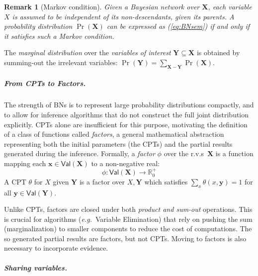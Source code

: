\documentclass[10pt,a4paper]{article}
\newcommand*{\eg}{\emph{e.g.}\xspace}
\newcommand*{\difset}{\mathrel{-}}
\newcommand{\Real}{\mathbb{R}}
\newcommand{\nnReal}{\Real^+_0}
\newcommand*{\setofrv}[1]{\mathsf{Val}(#1)}
\newcommand{\bX}{\mathbf X}
\newcommand{\bY}{\mathbf Y}
\newcommand{\bx}{{\mathbf x}}
\newcommand{\by}{{\mathbf y}}
\newcommand*{\someqfact}{\phi}
\newcommand{\rvs}{r.v.s\xspace}
\newtheorem{remark}[theorem]{Remark}
\begin{document}
\begin{remark}[Markov condition]
Given a Bayesian network over $\bX$, each variable $X$ is assumed to be independent of its non-descendants, given its parents.
A probability distribution $\Pr(\bX)$ can be expressed as (\ref{eq:BNsem}) if and only if it satisfies such a Markov condition.
\end{remark}

The \emph{marginal distribution} over the \emph{variables of interest} $\bY \subseteq \bX$ is obtained by summing-out the irrelevant variables:
$\Pr(\bY)= \sum_{\bX\difset\bY} \Pr(\bX)$.
 
\subparagraph{From CPTs to Factors.}

The strength of BNs is to represent large probability distributions compactly, and to allow for inference algorithms that do not construct the full joint distribution explicitly.
CPTs alone are insufficient for this purpose, motivating the definition of a class of functions called \emph{factors}, a general mathematical abstraction representing both the initial parameters (the CPTs) and the partial results generated during the inference.
Formally, a \emph{factor} $\someqfact$ over the \rvs\ $\bX$ is a function mapping each $\bx\in\setofrv{\bX}$ to a non-negative real:
\begin{equation}
\label{eq:factor}
\someqfact:\setofrv{\bX}\to\nnReal
\end{equation}
A CPT $\theta$ for $X$ given $\bY$ is a factor over $X,\bY$ which satisfies $\sum_x \theta({x,\by}) = 1$ for all $\by\in\setofrv{\bY}$.

Unlike CPTs, factors are closed under both \emph{product and sum-out} operations.
This is crucial for algorithms (\eg\ Variable Elimination) that rely on pushing the sum (marginalization) to smaller components to reduce the cost of computations.
The so generated partial results are factors, but not CPTs.
Moving to factors is also necessary to incorporate evidence.

\subparagraph{Sharing variables.}
\end{document}
